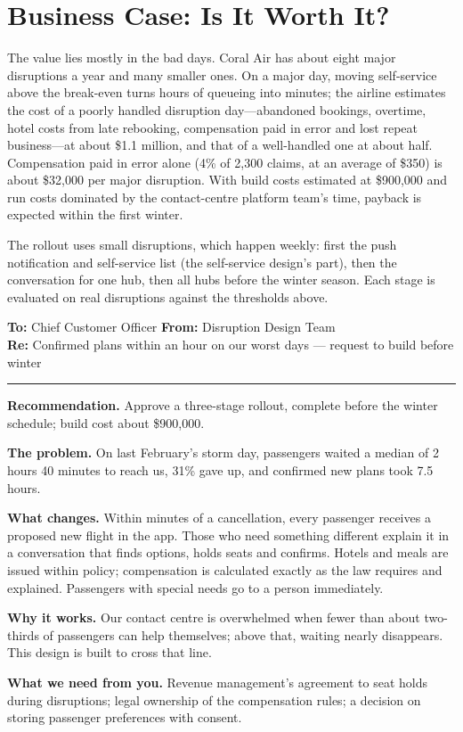 \section{Business Case: Is It Worth It?}
\label{sec:air-business}

The value lies mostly in the bad days. Coral Air has about eight major disruptions a year and many smaller ones. On a major day, moving self-service above the break-even turns hours of queueing into minutes; the airline estimates the cost of a poorly handled disruption day---abandoned bookings, overtime, hotel costs from late rebooking, compensation paid in error and lost repeat business---at about \$1.1 million, and that of a well-handled one at about half. Compensation paid in error alone (4\% of 2{,}300 claims, at an average of \$350) is about \$32{,}000 per major disruption. With build costs estimated at \$900{,}000 and run costs dominated by the contact-centre platform team's time, payback is expected within the first winter.

The rollout uses small disruptions, which happen weekly: first the push notification and self-service list (the self-service design's part), then the conversation for one hub, then all hubs before the winter season. Each stage is evaluated on real disruptions against the thresholds above.

\begin{tcolorbox}[colback=white, colframe=black!60, boxrule=0.6pt, arc=1pt, left=10pt, right=10pt, top=8pt, bottom=8pt, fontupper=\small]
\textbf{To:} Chief Customer Officer \hfill \textbf{From:} Disruption Design Team\\
\textbf{Re:} Confirmed plans within an hour on our worst days --- request to build before winter

\smallskip\hrule\smallskip

\textbf{Recommendation.} Approve a three-stage rollout, complete before the winter schedule; build cost about \$900{,}000.

\textbf{The problem.} On last February's storm day, passengers waited a median of 2 hours 40 minutes to reach us, 31\% gave up, and confirmed new plans took 7.5 hours.

\textbf{What changes.} Within minutes of a cancellation, every passenger receives a proposed new flight in the app. Those who need something different explain it in a conversation that finds options, holds seats and confirms. Hotels and meals are issued within policy; compensation is calculated exactly as the law requires and explained. Passengers with special needs go to a person immediately.

\textbf{Why it works.} Our contact centre is overwhelmed when fewer than about two-thirds of passengers can help themselves; above that, waiting nearly disappears. This design is built to cross that line.

\textbf{What we need from you.} Revenue management's agreement to seat holds during disruptions; legal ownership of the compensation rules; a decision on storing passenger preferences with consent.
\end{tcolorbox}


